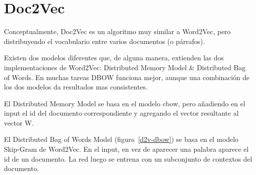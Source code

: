 \documentclass[withindex, glossary]{cam-thesis}
\begin{document}
\section{Doc2Vec}
Conceptualmente, Doc2Vec es un algoritmo muy similar a Word2Vec, pero distribuyendo el vocabulario entre varios documentos (o párrafos).

Existen dos modelos diferentes que, de alguna manera, extienden las dos implementaciones de Word2Vec: Distributed Memory Model \& Distributed Bag of Words. En muchas tareas DBOW funciona mejor, aunque una combinación de los dos modelos da resultados mas consistentes\cite{DBLP:journals/corr/LeM14}.

El Distributed Memory Model se basa en el modelo \acrshort{cbow}, pero añadiendo en el input el id del documento correspondiente y agregando el vector resultante al vector W.

El Distributed Bag of Words Model (figura~\ref{d2v-dbow}) se basa en el modelo Skip-Gram de Word2Vec. En el input, en vez de aparecer una palabra aparece el id de un documento. La red luego se entrena con un subconjunto de contextos del documento.
\end{document}
